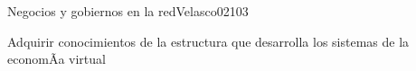 \begin{syllabus}
\begin{unit}{Negocios y gobiernos en la red}{Velasco02}{10}{3}
   \begin{unitgoals}
      \item Adquirir conocimientos de la estructura que desarrolla los sistemas de la economÃ­a virtual
   \end{unitgoals}
\end{unit}

\begin{coursebibliography}
\end{coursebibliography}
\end{syllabus}
